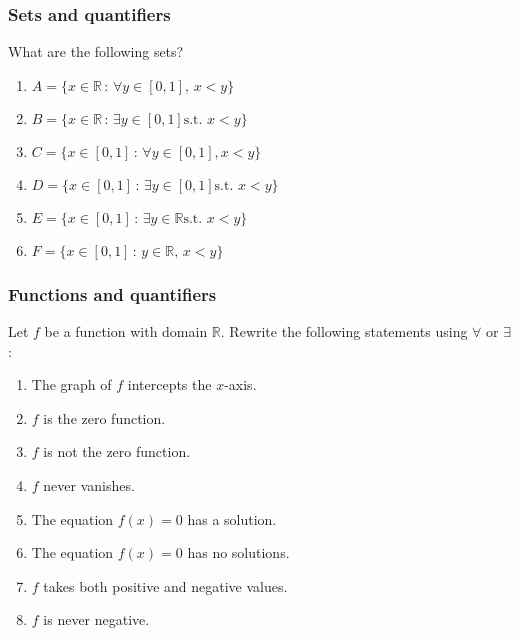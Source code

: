 \documentclass[14pt]{beamer}
\begin{document}

	\begin{frame}
		\frametitle{Sets and quantifiers}

		What are the following sets?

		\begin{enumerate}
			\item $\displaystyle A = \{ x \in \mathbb{R}\, : \, \forall y \in [0,1], \,
				x < y \}$

			\item $\displaystyle B = \{ x \in \mathbb{R}\, : \, \exists y \in [0,1] \text{
				s.t. }x < y \}$

			\item $\displaystyle C = \{ x \in [0,1] \, : \, \forall y \in [0,1], x < y
				\}$

			\item $\displaystyle D = \{ x \in [0,1] \, : \, \exists y \in [0,1] \text{
				s.t. }x < y \}$

			\item $\displaystyle E = \{ x \in [0,1] \, : \, \exists y \in \mathbb{R}\text{
				s.t. }x < y \}$

			\item $\displaystyle F = \{ x \in [0,1] \, : \, y \in \mathbb{R}, \, x < y
				\}$
		\end{enumerate}
	\end{frame}


	\begin{frame}
		\frametitle{Functions and quantifiers}

		Let $f$ be a function with domain $\mathbb{R}$. Rewrite the following statements
		using $\forall$ or $\exists$:

		\begin{enumerate}
			\item The graph of $f$ intercepts the $x$-axis.

			\item $f$ is the zero function.

			\item $f$ is not the zero function.

			\item $f$ never vanishes.

			\item The equation $\displaystyle f(x)=0$ has a solution.

			\item The equation $\displaystyle f(x)=0$ has no solutions.

			\item $f$ takes both positive and negative values.

			\item $f$ is never negative.
		\end{enumerate}
	\end{frame}
\end{document}
